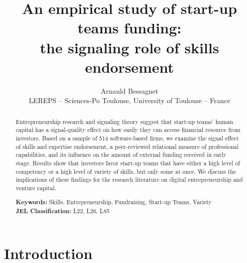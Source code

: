 \documentclass[12pt]{article}
\begin{document}
\title{An empirical study of start-up teams funding: \\ the signaling role of skills endorsement}
\date{\vspace{-3ex}}
\author{Arnauld Bessagnet \\ \footnotesize{LEREPS – Sciences-Po Toulouse, University of Toulouse – France} \\}

\maketitle \vspace{-1,5em}

\begin{abstract}
\noindent
Entrepreneurship research and signaling theory suggest that start-up teams' human capital has a signal-quality effect on how easily they can access financial resource from investors. Based on a sample of 514 software-based firms, we examine the signal effect of skills and expertise endorsement, a peer-reviewed relational measure of professional capabilities, and its influence on the amount of external funding received in early stage. Results show that investors favor start-up teams that have either a high level of competency or a high level of variety of skills, but only some at once. We discuss the implications of these findings for the research literature on digital entrepreneurship and venture capital. \newline

\begin{obeylines}
\noindent \footnotesize{}{\textbf{Keywords:} Skills, Entrepreneurship, Fundraising, Start-up Teams, Variety}
\noindent \footnotesize{\textbf{JEL Classification:} L22, L26, L85}
\end{obeylines}

\end{abstract}

\clearpage
\section{Introduction}


\end{document}
